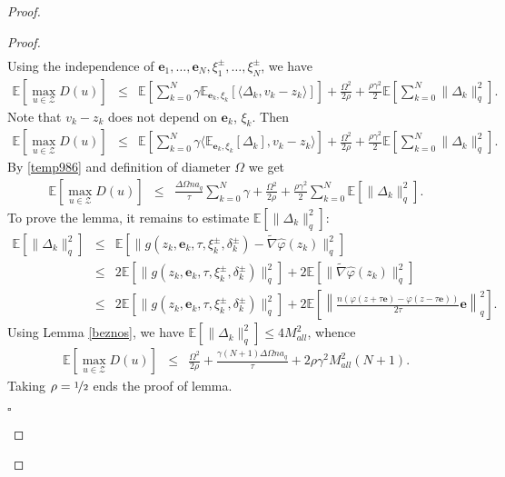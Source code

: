 \documentclass[runningheads]{llncs}
\newcommand{\EndProof}{\begin{flushright}$\square$\end{flushright}}
\begin{document}
\begin{proof}
\begin{proof}
\begin{eqnarray*}
\end{eqnarray*}
Using the independence of $\mathbf{e}_1, \ldots, \mathbf{e}_N, \xi^{\pm}_1, \ldots, \xi^{\pm}_N$, we have
\begin{eqnarray*}
    \mathbb{E}\left[\max_{u \in \mathcal{Z}} D(u)\right] &\leq& \mathbb{E}\left[\sum\limits_{k=0}^N \gamma \mathbb{E}_{\mathbf{e}_k, \xi_k}\left[\langle \Delta_k, v_k - z_k \rangle\right]\right]  + 
    \frac{\Omega^2}{2\rho} + \frac{\rho \gamma^2}{2}\mathbb{E}\left[\sum\limits_{k=0}^N \|\Delta_k\|_q^2\right]
    .  
\end{eqnarray*}
Note that $v_k - z_k$ does not depend on $\mathbf{e}_k$, $\xi_k$. Then 
\begin{eqnarray*}
    \mathbb{E}\left[\max_{u \in \mathcal{Z}} D(u)\right] &\leq& \mathbb{E}\left[\sum\limits_{k=0}^N \gamma \langle \mathbb{E}_{\mathbf{e}_k, \xi_k}\left[\Delta_k\right], v_k - z_k \rangle\right] + 
    \frac{\Omega^2}{2\rho} + \frac{\rho \gamma^2}{2}\mathbb{E}\left[\sum\limits_{k=0}^N \|\Delta_k\|_q^2\right].  
\end{eqnarray*}
By \eqref{temp986} and definition of diameter $\Omega$ we get
\begin{eqnarray*}
    \mathbb{E}\left[\max_{u \in \mathcal{Z}} D(u)\right] &\leq& \frac{\Delta \Omega n a_q}{\tau}\sum\limits_{k=0}^N \gamma + \frac{\Omega^2}{2\rho} + \frac{\rho \gamma^2}{2}\sum\limits_{k=0}^N \mathbb{E}\left[\|\Delta_k\|_q^2\right].  
\end{eqnarray*}
To prove the lemma, it remains to estimate $\mathbb{E}\left[\|\Delta_k\|_q^2\right]$:
\begin{eqnarray*}
    \mathbb{E}\left[\|\Delta_k\|_q^2\right] &\leq& \mathbb{E}\left[\|g(z_k, \mathbf{e}_k, \tau,  \xi^{\pm}_k, \delta^{\pm}_k) -  \tilde\nabla\hat{\varphi}(z_k)\|_q^2\right]  \nonumber\\
    &\leq& 2 \mathbb{E}\left[\|g(z_k, \mathbf{e}_k, \tau,  \xi^{\pm}_k, \delta^{\pm}_k)\|_q^2\right] +  2 \mathbb{E}\left[\|\tilde\nabla\hat{\varphi}(z_k)\|_q^2\right]\nonumber\\
    &\leq& 2 \mathbb{E}\left[\|g(z_k, \mathbf{e}_k, \tau,  \xi^{\pm}_k, \delta^{\pm}_k)\|_q^2\right] +  2 \mathbb{E}\left[\left\|\frac{n\left(\varphi(z + \tau \mathbf{e}) -  \varphi(z - \tau \mathbf{e})\right)}{2\tau}\mathbf{e}\right\|_q^2\right]
    .  
\end{eqnarray*}
Using Lemma \ref{beznos},  we have $\mathbb{E}\left[\|\Delta_k\|_q^2\right] \leq 4M^2_{all}$, whence
\begin{eqnarray*}
    \mathbb{E}\left[\max_{u \in \mathcal{Z}} D(u)\right] &\leq& 
    \frac{\Omega^2}{2\rho} + \frac{\gamma (N+1)\Delta \Omega n a_q}{\tau} + 2\rho\gamma^2 M^2_{all}(N+1).  
\end{eqnarray*}
Taking $\rho = \nicefrac{1}{2}$ ends the proof of lemma.
\EndProof
\end{proof}


\end{proof}
\end{document}
